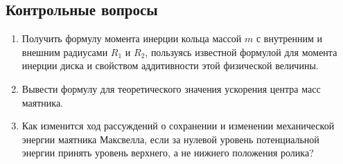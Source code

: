 \documentclass[a4paper, 12pt]{extarticle}
\begin{document}
\subsection{Контрольные вопросы}
\begin{enumerate}
\item Получить формулу момента инерции кольца массой $m$ с внутренним и внешним радиусами $R_1$ и $R_2$, пользуясь известной формулой для момента инерции диска и свойством аддитивности этой физической величины.
\item Вывести формулу для теоретического значения  ускорения центра масс маятника.
\item Как изменится ход рассуждений о сохранении и изменении механической энергии маятника Максвелла, если за нулевой уровень потенциальной энергии принять уровень верхнего, а не нижнего положения ролика?
\end{enumerate}
\end{document}
